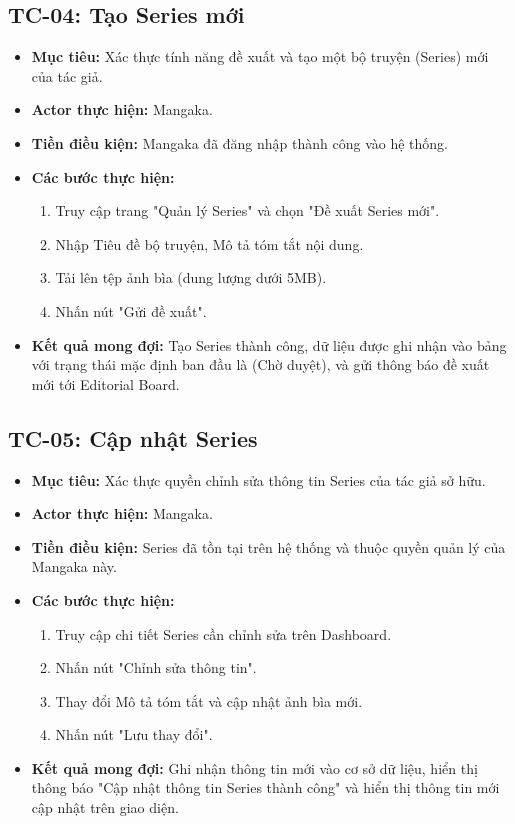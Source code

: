 \subsection{TC-04: Tạo Series mới}
\label{subsec:tc04_create_series}
\begin{itemize}
    \item \textbf{Mục tiêu:} Xác thực tính năng đề xuất và tạo một bộ truyện (Series) mới của tác giả.
    \item \textbf{Actor thực hiện:} Mangaka.
    \item \textbf{Tiền điều kiện:} Mangaka đã đăng nhập thành công vào hệ thống.
    \item \textbf{Các bước thực hiện:}
    \begin{enumerate}
        \item Truy cập trang "Quản lý Series" và chọn "Đề xuất Series mới".
        \item Nhập Tiêu đề bộ truyện, Mô tả tóm tắt nội dung.
        \item Tải lên tệp ảnh bìa (dung lượng dưới 5MB).
        \item Nhấn nút "Gửi đề xuất".
    \end{enumerate}
    \item \textbf{Kết quả mong đợi:} Tạo Series thành công, dữ liệu được ghi nhận vào bảng  với trạng thái mặc định ban đầu là  (Chờ duyệt), và gửi thông báo đề xuất mới tới Editorial Board.
\end{itemize}

\subsection{TC-05: Cập nhật Series}
\label{subsec:tc05_update_series}
\begin{itemize}
    \item \textbf{Mục tiêu:} Xác thực quyền chỉnh sửa thông tin Series của tác giả sở hữu.
    \item \textbf{Actor thực hiện:} Mangaka.
    \item \textbf{Tiền điều kiện:} Series đã tồn tại trên hệ thống và thuộc quyền quản lý của Mangaka này.
    \item \textbf{Các bước thực hiện:}
    \begin{enumerate}
        \item Truy cập chi tiết Series cần chỉnh sửa trên Dashboard.
        \item Nhấn nút "Chỉnh sửa thông tin".
        \item Thay đổi Mô tả tóm tắt và cập nhật ảnh bìa mới.
        \item Nhấn nút "Lưu thay đổi".
    \end{enumerate}
    \item \textbf{Kết quả mong đợi:} Ghi nhận thông tin mới vào cơ sở dữ liệu, hiển thị thông báo "Cập nhật thông tin Series thành công" và hiển thị thông tin mới cập nhật trên giao diện.
\end{itemize}


